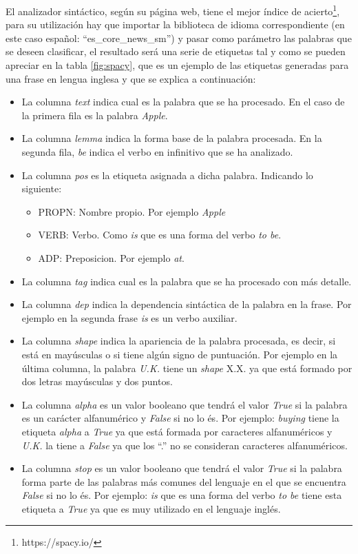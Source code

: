 El analizador sintáctico, según su página web, tiene el mejor índice de acierto\footnote{https://spacy.io/}, para su utilización hay que importar la biblioteca de idioma correspondiente (en este caso español: ``es\_core\_news\_sm'') y pasar como parámetro las palabras que se deseen clasificar, el resultado será una serie de etiquetas tal y como se pueden apreciar en la tabla \ref{fig:spacy}, que es un ejemplo de las etiquetas generadas para una frase en lengua inglesa y que se explica a continuación:
\begin{itemize}
	\item La columna \textit{text} indica cual es la palabra que se ha procesado. En el caso de la primera fila es la palabra \textit{Apple}.
	\item La columna \textit{lemma} indica la forma base de la palabra procesada. En la segunda fila, \textit{be} indica el verbo en infinitivo que se ha analizado.
	\item La columna \textit{pos} es la etiqueta asignada a dicha palabra. Indicando lo siguiente:
		\begin{itemize}
			\item PROPN: Nombre propio. Por ejemplo \textit{Apple}
			\item VERB: Verbo. Como \textit{is} que es una forma del verbo \textit{to be}.
			\item ADP: Preposicion. Por ejemplo \textit{at}.
		\end{itemize}
	
	\item La columna \textit{tag} indica cual es la palabra que se ha procesado con más detalle.
	\item La columna \textit{dep} indica la dependencia sintáctica de la palabra en la frase. Por ejemplo en la segunda frase \textit{is} es un verbo auxiliar.
	\item La columna \textit{shape} indica la apariencia de la palabra procesada, es decir, si está en mayúsculas o si tiene algún signo de puntuación. Por ejemplo en la última columna, la palabra \textit{U.K.} tiene un \textit{shape} X.X. ya que está formado por dos letras mayúsculas y dos puntos.
	\item La columna \textit{alpha} es un valor booleano que tendrá el valor \textit{True} si la palabra es un carácter alfanumérico y \textit{False} si no lo és. Por ejemplo: \textit{buying} tiene la etiqueta \textit{alpha} a \textit{True} ya que está formada por caracteres alfanuméricos y \textit{U.K.} la tiene a \textit{False} ya que los ``.'' no se consideran caracteres alfanuméricos.
	\item La columna \textit{stop} es un valor booleano que tendrá el valor \textit{True} si la palabra forma parte de las palabras más comunes del lenguaje en el que se encuentra \textit{False} si no lo és. Por ejemplo: \textit{is} que es una forma del verbo \textit{to be} tiene esta etiqueta a \textit{True} ya que es muy utilizado en el lenguaje inglés.
\end{itemize}



